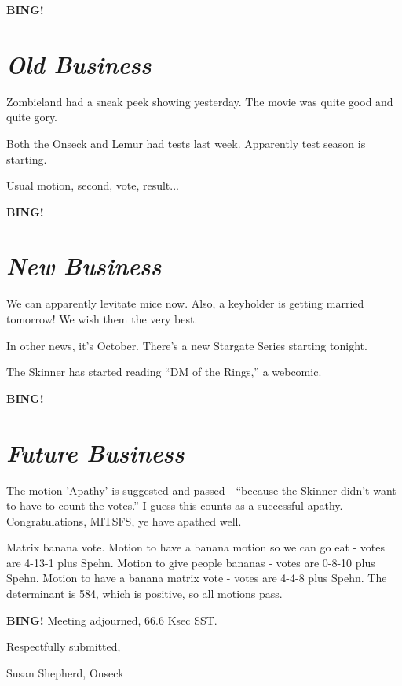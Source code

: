 \documentclass[10pt]{article}
\newcommand{\bing}{{\bf BING!} }
\newcommand{\goto}[1]{\bing \vskip 12pt \section*{{\em{#1}}}}
\newcommand{\ps}{ plus Spehn\xspace}
\begin{document}
\goto{Old Business}

Zombieland had a sneak peek showing yesterday. The movie was quite good and quite gory.

Both the Onseck and Lemur had tests last week. Apparently test season is starting.

Usual motion, second, vote, result...

\goto{New Business}

We can apparently levitate mice now. Also, a keyholder is getting married tomorrow! We wish them the very best.

In other news, it's October. There's a new Stargate Series starting tonight.

The Skinner has started reading ``DM of the Rings,'' a webcomic.

\goto{Future Business}

The motion 'Apathy' is suggested and passed - ``because the Skinner didn't want to have to count the votes.'' I guess this counts as a successful apathy. Congratulations, MITSFS, ye have apathed well.

Matrix banana vote.
Motion to have a banana motion so we can go eat - votes are 4-13-1\ps.
Motion to give people bananas - votes are 0-8-10\ps.
Motion to have a banana matrix vote - votes are 4-4-8\ps.
The determinant is 584, which is positive, so all motions pass.

\bing
\noindent
Meeting adjourned, 66.6 Ksec SST.

\vspace{18pt}

\centerline{Respectfully submitted,}
\centerline{Susan Shepherd, Onseck}
\end{document}
